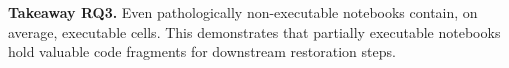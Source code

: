 \begin{tcolorbox} [left=0mm, right=0mm, top=0mm, bottom=0mm]

    \textbf{Takeaway RQ3.} Even pathologically non-executable notebooks contain, on average, \averagePercentPartialPathological executable cells. 
    This demonstrates that partially executable notebooks hold valuable code fragments for downstream restoration steps.
\end{tcolorbox}








        

        
          
        
